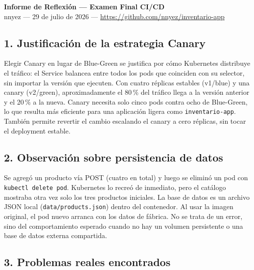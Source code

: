 \documentclass[12pt,a4paper]{article}
\begin{document}
\begin{center}
{\Large\bfseries Informe de Reflexi\'on --- Examen Final CI/CD}\\[0.2cm]
{\small nnyez --- 29 de julio de 2026 --- \url{https://github.com/nnyez/inventario-app}}
\end{center}

\subsection*{1. Justificación de la estrategia Canary}

Elegir Canary en lugar de Blue-Green se justifica por c\'omo Kubernetes distribuye el tr\'afico: el Service balancea entre todos los pods que coinciden con su selector, sin importar la versi\'on que ejecuten. Con cuatro r\'eplicas estables (v1/blue) y una canary (v2/green), aproximadamente el 80\,\% del tr\'afico llega a la versi\'on anterior y el 20\,\% a la nueva. Canary necesita solo cinco pods contra ocho de Blue-Green, lo que resulta m\'as eficiente para una aplicaci\'on ligera como \texttt{inventario-app}. Tambi\'en permite revertir el cambio escalando el canary a cero r\'eplicas, sin tocar el deployment estable.

\subsection*{2. Observaci\'on sobre persistencia de datos}

Se agreg\'o un producto v\'ia POST (cuatro en total) y luego se elimin\'o un pod con \texttt{kubectl delete pod}. Kubernetes lo recre\'o de inmediato, pero el cat\'alogo mostraba otra vez solo los tres productos iniciales. La base de datos es un archivo JSON local (\texttt{data/products.json}) dentro del contenedor. Al usar la imagen original, el pod nuevo arranca con los datos de f\'abrica. No se trata de un error, sino del comportamiento esperado cuando no hay un volumen persistente o una base de datos externa compartida.

\subsection*{3. Problemas reales encontrados}
\end{document}
